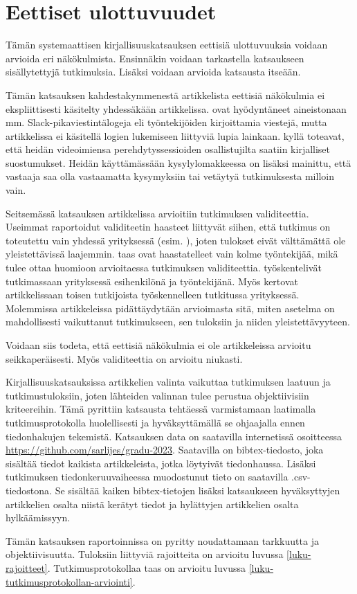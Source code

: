 \documentclass[utf8]{gradu3}
\begin{document}
\section{Eettiset ulottuvuudet}

Tämän systemaattisen kirjallisuuskatsauksen eettisiä ulottuvuuksia voidaan arvioida eri näkökulmista. Ensinnäkin voidaan tarkastella katsaukseen sisällytettyjä tutkimuksia. Lisäksi voidaan arvioida katsausta itseään.

Tämän katsauksen kahdestakymmenestä artikkelista eettisiä näkökulmia ei ekspliittisesti käsitelty yhdessäkään artikkelissa. \textcite{moe-ym-2020} ovat hyödyntäneet aineistonaan mm. Slack-pikaviestintälogeja eli työntekijöiden kirjoittamia viestejä, mutta artikkelissa ei käsitellä logien lukemiseen liittyviä lupia lainkaan. \textcite{yates-ym-2020} kyllä toteavat, että heidän videoimiensa perehdytyssessioiden osallistujilta saatiin kirjalliset suostumukset. Heidän käyttämässään kysylylomakkeessa on lisäksi mainittu, että vastaaja saa olla vastaamatta kysymyksiin tai vetäytyä tutkimuksesta milloin vain. 

Seitsemässä katsauksen artikkelissa arvioitiin tutkimuksen validiteettia. Useimmat raportoidut validiteetin haasteet liittyvät siihen, että tutkimus on toteutettu vain yhdessä yrityksessä (esim. \textcite{johnson-senges-2010}), joten tulokset eivät välttämättä ole yleistettävissä laajemmin. \textcite{viana-ym-2014} taas ovat haastatelleet vain kolme työntekijää, mikä tulee ottaa huomioon arvioitaessa tutkimuksen validiteettia. \textcite{hemphill-begel-2011} työskentelivät tutkimassaan yrityksessä esihenkilönä ja työntekijänä. Myös \textcite{kumar-wallace-2019} kertovat artikkelissaan toisen tutkijoista työskennelleen tutkitussa yrityksessä. Molemmissa artikkeleissa pidättäydytään arvioimasta sitä, miten asetelma on mahdollisesti vaikuttanut tutkimukseen, sen tuloksiin ja niiden yleistettävyyteen.

Voidaan siis todeta, että eettisiä näkökulmia ei ole artikkeleissa arvioitu seikkaperäisesti. Myös validiteettia on arvioitu niukasti.

Kirjallisuuskatsauksissa artikkelien valinta vaikuttaa tutkimuksen laatuun ja tutkimustuloksiin, joten lähteiden valinnan tulee perustua objektiivisiin kriteereihin. Tämä pyrittiin katsausta tehtäessä varmistamaan laatimalla tutkimusprotokolla huolellisesti ja hyväksyttämällä se ohjaajalla ennen tiedonhakujen tekemistä. Katsauksen data on saatavilla internetissä osoitteessa 
 \href{https://github.com/sarlijes/gradu-2023}{https://github.com/sarlijes/gradu-2023}. Saatavilla on bibtex-tiedosto, joka sisältää tiedot kaikista artikkeleista, jotka löytyivät tiedonhaussa. Lisäksi tutkimuksen tiedonkeruuvaiheessa muodostunut tieto on saatavilla .csv-tiedostona. Se sisältää kaiken bibtex-tietojen lisäksi katsaukseen hyväksyttyjen artikkelien osalta niistä kerätyt tiedot ja hylättyjen artikkelien osalta hylkäämissyyn. 

Tämän katsauksen raportoinnissa on pyritty noudattamaan tarkkuutta ja objektiivisuutta. Tuloksiin liittyviä rajoitteita on arvioitu luvussa \ref{luku-rajoitteet}. Tutkimusprotokollaa taas on arvioitu luvussa \ref{luku-tutkimusprotokollan-arviointi}.


\printbibliography
\end{document}
